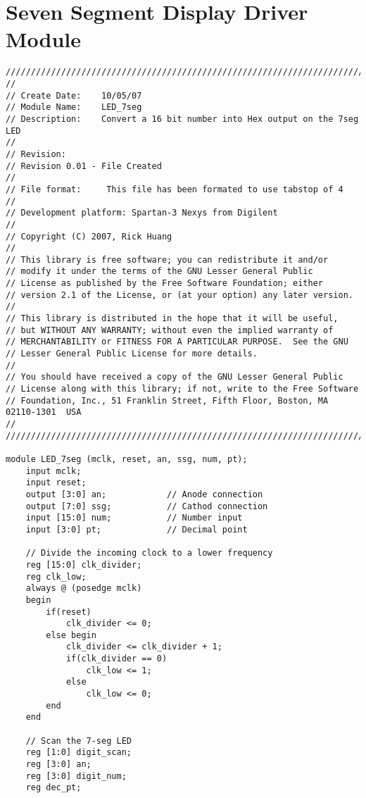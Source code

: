 \section{Seven Segment Display Driver Module}
\label{sec:LED_7seg}
\begin{lstlisting}[style=verilog-style,basicstyle=\tiny]
////////////////////////////////////////////////////////////////////////////////
//
// Create Date:    10/05/07
// Module Name:    LED_7seg
// Description:    Convert a 16 bit number into Hex output on the 7seg LED
//
// Revision:
// Revision 0.01 - File Created
//
// File format:		This file has been formated to use tabstop of 4
//
// Development platform: Spartan-3 Nexys from Digilent
//
// Copyright (C) 2007, Rick Huang
//   
// This library is free software; you can redistribute it and/or
// modify it under the terms of the GNU Lesser General Public
// License as published by the Free Software Foundation; either
// version 2.1 of the License, or (at your option) any later version.
// 
// This library is distributed in the hope that it will be useful,
// but WITHOUT ANY WARRANTY; without even the implied warranty of
// MERCHANTABILITY or FITNESS FOR A PARTICULAR PURPOSE.  See the GNU
// Lesser General Public License for more details.
// 
// You should have received a copy of the GNU Lesser General Public
// License along with this library; if not, write to the Free Software
// Foundation, Inc., 51 Franklin Street, Fifth Floor, Boston, MA  02110-1301  USA
// 
////////////////////////////////////////////////////////////////////////////////

module LED_7seg (mclk, reset, an, ssg, num, pt);
	input mclk;
	input reset;
	output [3:0] an;			// Anode connection
	output [7:0] ssg;			// Cathod connection
	input [15:0] num;			// Number input
	input [3:0] pt;				// Decimal point

	// Divide the incoming clock to a lower frequency
	reg [15:0] clk_divider;
	reg clk_low;
	always @ (posedge mclk)
	begin
		if(reset)
			clk_divider <= 0;
		else begin
			clk_divider <= clk_divider + 1;
			if(clk_divider == 0)
				clk_low <= 1;
			else
				clk_low <= 0;
		end
	end

	// Scan the 7-seg LED
	reg [1:0] digit_scan;
	reg [3:0] an;
	reg [3:0] digit_num;
	reg dec_pt;
	

\end{lstlisting}
